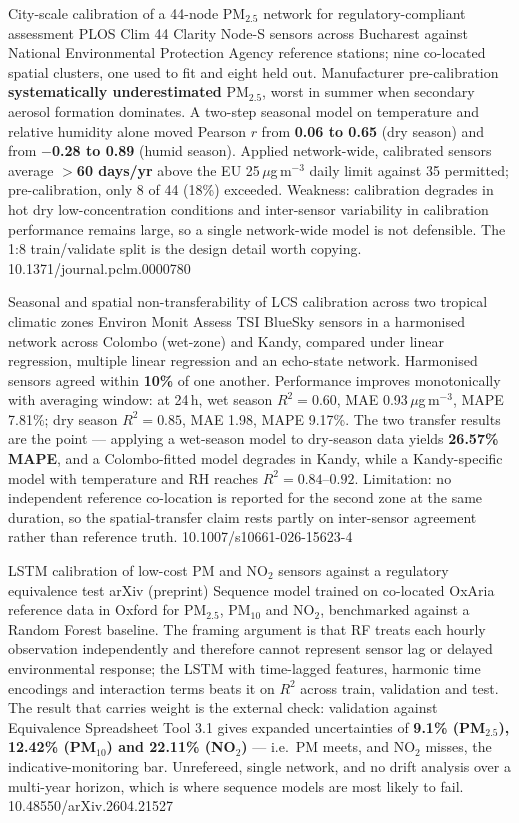 \documentclass[10pt]{article}
\begin{document}
{City-scale calibration of a 44-node PM$_{2.5}$ network for regulatory-compliant assessment}
{PLOS Clim}
{44 Clarity Node-S sensors across Bucharest against National Environmental Protection Agency
reference stations; nine co-located spatial clusters, one used to fit and eight held out.
Manufacturer pre-calibration \textbf{systematically underestimated} PM$_{2.5}$, worst in
summer when secondary aerosol formation dominates. A two-step seasonal model on temperature
and relative humidity alone moved Pearson $r$ from \textbf{0.06 to 0.65} (dry season) and
from \textbf{$-$0.28 to 0.89} (humid season). Applied network-wide, calibrated sensors
average \textbf{$>$60 days/yr} above the EU 25\,$\mu$g\,m$^{-3}$ daily limit against 35
permitted; pre-calibration, only 8 of 44 (18\%) exceeded. Weakness: calibration degrades in
hot dry low-concentration conditions and inter-sensor variability in calibration performance
remains large, so a single network-wide model is not defensible. The 1:8 train/validate
split is the design detail worth copying.}
{10.1371/journal.pclm.0000780}

{Seasonal and spatial non-transferability of LCS calibration across two tropical climatic zones}
{Environ Monit Assess}
{TSI BlueSky sensors in a harmonised network across Colombo (wet-zone) and Kandy, compared
under linear regression, multiple linear regression and an echo-state network. Harmonised
sensors agreed within \textbf{10\%} of one another. Performance improves monotonically with
averaging window: at 24\,h, wet season $R^2=0.60$, MAE 0.93\,$\mu$g\,m$^{-3}$, MAPE 7.81\%;
dry season $R^2=0.85$, MAE 1.98, MAPE 9.17\%. The two transfer results are the point ---
applying a wet-season model to dry-season data yields \textbf{26.57\% MAPE}, and a
Colombo-fitted model degrades in Kandy, while a Kandy-specific model with temperature and RH
reaches $R^2=0.84$--$0.92$. Limitation: no independent reference co-location is reported for
the second zone at the same duration, so the spatial-transfer claim rests partly on
inter-sensor agreement rather than reference truth.}
{10.1007/s10661-026-15623-4}

{LSTM calibration of low-cost PM and NO$_2$ sensors against a regulatory equivalence test}
{arXiv (preprint)}
{Sequence model trained on co-located OxAria reference data in Oxford for PM$_{2.5}$,
PM$_{10}$ and NO$_2$, benchmarked against a Random Forest baseline. The framing argument is
that RF treats each hourly observation independently and therefore cannot represent sensor
lag or delayed environmental response; the LSTM with time-lagged features, harmonic time
encodings and interaction terms beats it on $R^2$ across train, validation and test.
The result that carries weight is the external check: validation against Equivalence
Spreadsheet Tool 3.1 gives expanded uncertainties of \textbf{9.1\% (PM$_{2.5}$),
12.42\% (PM$_{10}$) and 22.11\% (NO$_2$)} --- i.e.\ PM meets, and NO$_2$ misses, the
indicative-monitoring bar. Unrefereed, single network, and no drift analysis over a
multi-year horizon, which is where sequence models are most likely to fail.}
{10.48550/arXiv.2604.21527}
\end{document}
